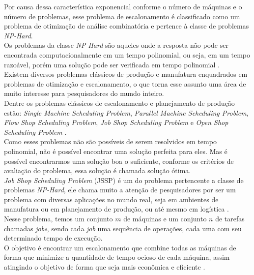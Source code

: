 Por causa dessa característica exponencial conforme o número de máquinas e o número de problemas, esse problema de escalonamento é classificado como um problema de otimização de análise combinatória e pertence à classe de problemas \textit{NP-Hard}.\\
Os problemas da classe \textit{NP-Hard} são aqueles onde a resposta não pode ser encontrada computacionalmente em um tempo polinomial, ou seja, em um tempo razoável, porém uma solução pode ser verificada em tempo polinomial \cite{Eswaramurthy2008}.\\
Existem diversos problemas clássicos de produção e manufatura enquadrados em problemas de otimização e escalonamento, o que torna esse assunto uma área de muito interesse para pesquisadores do mundo inteiro.\\
Dentre os problemas clássicos de escalonamento e planejamento de produção estão: 
\textit{Single Machine Scheduling Problem}, 
\textit{Parallel Machine Scheduling Problem}, 
\textit{Flow Shop Scheduling Problem}, 
\textit{Job Shop Scheduling Problem} e 
\textit{Open Shop Scheduling Problem} 
\cite{Allahverdi2008}.\\
Como esses problemas não são possíveis de serem resolvidos em tempo polinomial, não é possível encontrar uma solução perfeita para eles. Mas é possível encontrarmos uma solução boa o suficiente, conforme os critérios de avaliação do problema, essa solução é chamada solução ótima.\\
\textit{Job Shop Scheduling Problem} (JSSP) é um do problema pertencente a classe de problemas \textit{NP-Hard}, ele chama muito a atenção de pesquisadores por ser um problema com diversas aplicações no mundo real, seja em ambientes de manufatura ou em planejamento de produção, ou até mesmo em logística \cite{Cheng1996}.\\
Nesse problema, temos um conjunto $m$ de máquinas e um conjunto $n$ de tarefas chamadas \textit{jobs}, sendo cada \textit{job} uma sequência de operações, cada uma com seu determinado tempo de execução.\\ 
O objetivo é encontrar um escalonamento que combine todas as máquinas de forma que minimize a quantidade de tempo ocioso de cada máquina, assim atingindo o objetivo de forma que seja mais econômica e eficiente \cite{Cheng1996}.\\
